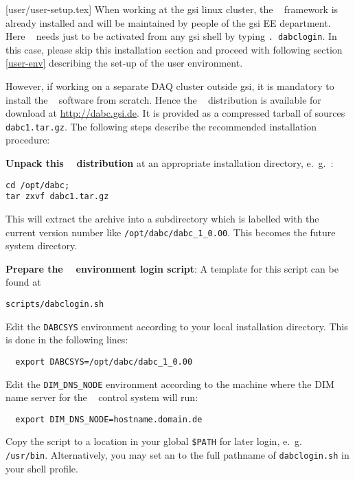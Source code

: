[user/user-setup.tex]
\label{user-setup-chapter}
When working at the gsi linux cluster, the \dabc~ framework is already installed and will
be maintained by people of the gsi EE department. Here \dabc~ needs just to be
activated from any gsi shell by typing {\tt . dabclogin}. In this case, 
please skip this installation section and proceed with following section \ref{user-env} describing
the set-up of the user environment.

However, if working on a separate DAQ cluster outside gsi, 
it is mandatory to install the \dabc~ software
from scratch. 
Hence the \dabc~ distribution is available for download at \hyperref{http://dabc.gsi.de}{}{}{http://dabc.gsi.de}.
It is provided as a compressed tarball of sources {\tt dabc1.tar.gz}.
The following steps describe the recommended installation procedure:

\bnum
\item {\bf Unpack this \dabc~ distribution} at an appropriate installation directory,
e.~g.~:
\begin{small}
\begin{verbatim}
cd /opt/dabc; 
tar zxvf dabc1.tar.gz
\end{verbatim}
\end{small}
This will extract the archive into a subdirectory which is labelled
with the current version number like {\tt /opt/dabc/dabc\_1\_0.00}.
This becomes the future \dabc~ system directory.

\item {\bf Prepare the \dabc~ environment login script}:
A template for this script can be found at  
\begin{small}
\begin{verbatim}
scripts/dabclogin.sh
\end{verbatim}
\end{small}


\bbul
  \item Edit the {\tt DABCSYS} environment according to your local installation directory. 
  This is done in the following lines:
  \begin{small}
  \begin{verbatim}
  export DABCSYS=/opt/dabc/dabc_1_0.00  
  \end{verbatim}  
  \end{small}
  
  \item Edit the {\tt DIM\_DNS\_NODE} environment according to the machine where 
  the DIM name server \cite{DIM} for the \dabc~ control system will run:
  \begin{small}
  \begin{verbatim}
  export DIM_DNS_NODE=hostname.domain.de
  \end{verbatim}  
  \end{small}
  \item Copy the script to a location in your global {\tt \$PATH} for later login,
  e.~g.~ {\tt /usr/bin}. Alternatively, you
  may set an  to the full pathname of {\tt dabclogin.sh} in your shell profile.
\ebul

